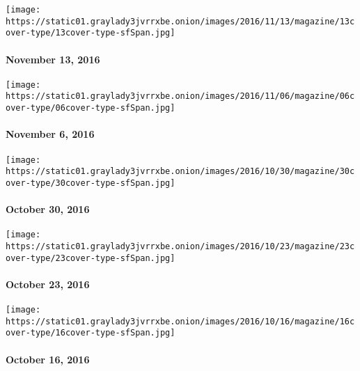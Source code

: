 \href{http://www.nytimes3xbfgragh.onion/indexes/2016/11/13/magazine/index.html}{}

\texttt{[image: https://static01.graylady3jvrrxbe.onion/images/2016/11/13/magazine/13cover-type/13cover-type-sfSpan.jpg]}

\hypertarget{november-13-2016}{%
\paragraph{November 13, 2016}\label{november-13-2016}}

\href{http://www.nytimes3xbfgragh.onion/indexes/2016/11/06/magazine/index.html}{}

\texttt{[image: https://static01.graylady3jvrrxbe.onion/images/2016/11/06/magazine/06cover-type/06cover-type-sfSpan.jpg]}

\hypertarget{november-6-2016}{%
\paragraph{November 6, 2016}\label{november-6-2016}}

\href{http://www.nytimes3xbfgragh.onion/indexes/2016/10/30/magazine/index.html}{}

\texttt{[image: https://static01.graylady3jvrrxbe.onion/images/2016/10/30/magazine/30cover-type/30cover-type-sfSpan.jpg]}

\hypertarget{october-30-2016}{%
\paragraph{October 30, 2016}\label{october-30-2016}}

\href{http://www.nytimes3xbfgragh.onion/indexes/2016/10/23/magazine/index.html}{}

\texttt{[image: https://static01.graylady3jvrrxbe.onion/images/2016/10/23/magazine/23cover-type/23cover-type-sfSpan.jpg]}

\hypertarget{october-23-2016}{%
\paragraph{October 23, 2016}\label{october-23-2016}}

\href{http://www.nytimes3xbfgragh.onion/indexes/2016/10/16/magazine/index.html}{}

\texttt{[image: https://static01.graylady3jvrrxbe.onion/images/2016/10/16/magazine/16cover-type/16cover-type-sfSpan.jpg]}

\hypertarget{october-16-2016}{%
\paragraph{October 16, 2016}\label{october-16-2016}}

